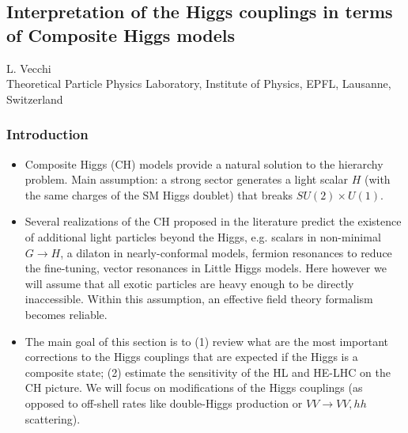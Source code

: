 \documentclass[../report.tex]{subfiles}
\begin{document}
\subsection{Interpretation of the Higgs couplings in terms of Composite Higgs models}
\label{sec9:CHM}
\begin{center}
 {L. Vecchi\\
}
 {\small Theoretical Particle Physics Laboratory, Institute of Physics, EPFL, Lausanne, Switzerland}
\end{center}

\subsubsection{Introduction}

\begin{itemize}
\item Composite Higgs (CH) models provide a natural solution to the hierarchy problem. Main assumption: a strong sector generates a light scalar $H$ (with the same charges of the SM Higgs doublet) that breaks $SU(2)\times U(1)$. %

\item Several realizations of the CH proposed in the literature predict the existence of additional light particles beyond the Higgs, e.g. scalars in non-minimal $G\to H$, a dilaton in nearly-conformal models, fermion resonances to reduce the fine-tuning, vector resonances in Little Higgs models. Here however we will assume that all exotic particles are heavy enough to be directly inaccessible. Within this assumption, an effective field theory formalism becomes reliable.


\item The main goal of this section is to (1) review what are the most important corrections to the Higgs couplings that are expected if the Higgs is a composite state; (2) estimate the sensitivity of the HL and HE-LHC on the CH picture. We will focus on modifications of the Higgs couplings (as opposed to off-shell rates like double-Higgs production or $VV\to VV,hh$ scattering). 



\end{itemize}
\end{document}
